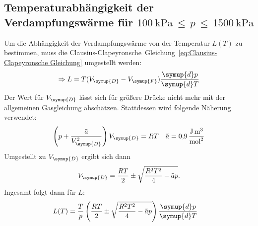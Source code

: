 \subsection{Temperaturabhängigkeit der Verdampfungswärme für $\qty{100}{\kilo\pascal}\,≤\,p\,≤\,\qty{1500}{\kilo\pascal}$}
\label{sec:Auswertung_2}
Um die Abhängigkeit der Verdampfungswärme von der Temperatur $L(T)$ zu bestimmen, muss die 
Clausius-Clapeyronsche~Gleichung~\eqref{eq:Clausius-Clapeyronsche Gleichung} umgestellt werden:
\begin{align*}
  \Rightarrow L = T(V_{\symup{D}}-V_{\symup{F}})\frac{\symup{d}p}{\symup{d}T}
\end{align*}
Der Wert für $V_{\symup{D}}$ lässt sich für größere Drücke nicht mehr mit der allgemeinen Gasgleichung abschätzen. Stattdessen wird folgende Näherung
verwendet:
\begin{align*}
  \left(p+\frac{\tilde{a}}{V_{\symup{D}}^2}\right)V_{\symup{D}} &= RT  &  \tilde{a} &= \qty{0.9}{\joule\cubic\metre\per\square\mol} \\
\end{align*}
Umgestellt zu $V_{\symup{D}}$ ergibt sich dann
\begin{align*}
  V_{\symup{D}} = \frac{RT}{2}\pm\sqrt{\frac{R^2T^2}{4}-\tilde{a}p}.
\end{align*}
Ingesamt folgt dann für $L$:
\begin{align}
  L(T) &= \frac{T}{p}\left(\frac{RT}{2}\pm\sqrt{\frac{R^2T^2}{4}-\tilde{a}p}\right)\frac{\symup{d}p}{\symup{d}T}
  \label{eq:L(T)}
\end{align}

